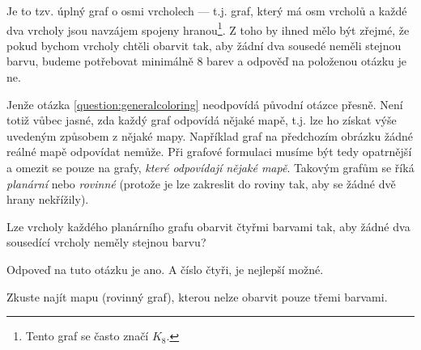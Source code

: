 \begin{center}
\end{center}

Je to tzv. úplný graf o osmi vrcholech --- t.j. graf, který má osm vrcholů a každé dva vrcholy jsou navzájem spojeny hranou\footnote{Tento graf se často značí $K_8$.}. Z toho by ihned mělo být zřejmé, že pokud bychom vrcholy chtěli obarvit tak, aby žádní dva sousedé neměli stejnou barvu, budeme potřebovat minimálně 8 barev a odpověď na položenou otázku je ne.

Jenže otázka \ref{question:generalcoloring} neodpovídá původní otázce přesně. Není
totiž vůbec jasné, zda každý graf odpovídá nějaké mapě, t.j. lze ho získat výše uvedeným způsobem z nějaké mapy. Například graf na předchozím obrázku žádné reálné
mapě odpovídat nemůže. Při grafové formulaci musíme být tedy opatrnější a omezit
se pouze na grafy, \emph{které odpovídají nějaké mapě}. Takovým grafům se říká
\emph{planární} nebo \emph{rovinné} (protože je lze zakreslit do roviny tak, aby se žádné dvě hrany nekřížily).

\begin{question}\label{question:planarcoloring} Lze vrcholy každého planárního grafu obarvit čtyřmi barvami tak, aby žádné dva sousedící vrcholy neměly stejnou barvu?
\end{question}

Odpoveď na tuto otázku je ano. A číslo čtyři, je nejlepší možné.

\begin{cviceni} Zkuste najít mapu (rovinný graf), kterou nelze obarvit pouze třemi barvami.
\end{cviceni}

